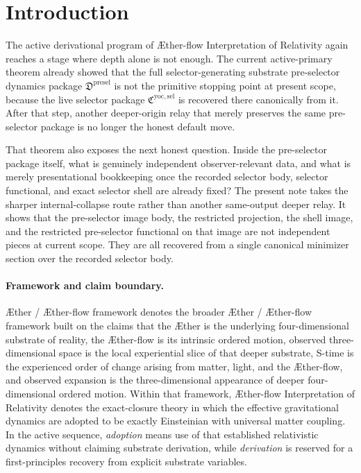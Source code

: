 \documentclass[11pt]{article}
\newcommand{\Aether}{\AE{}ther}
\newcommand{\Aflow}{\AE{}ther-flow}
\newcommand{\TheoryName}{\Aflow{} Interpretation of Relativity}
\newcommand{\TheoryProgram}{\Aether{} / \Aflow{} framework}
\newcommand{\YoctoSelectorPackage}{\mathfrak C^{\mathrm{yoc,sel}}}
\newcommand{\PreSelectorPackage}{\mathfrak D^{\mathrm{presel}}}
\begin{document}
\section{Introduction}

The active derivational program of \TheoryName{} again reaches a stage where depth alone is not enough. The current active-primary theorem already showed that the full selector-generating substrate pre-selector dynamics package \(\PreSelectorPackage\) is not the primitive stopping point at present scope, because the live selector package \(\YoctoSelectorPackage\) is recovered there canonically from it. After that step, another deeper-origin relay that merely preserves the same pre-selector package is no longer the honest default move.

That theorem also exposes the next honest question. Inside the pre-selector package itself, what is genuinely independent observer-relevant data, and what is merely presentational bookkeeping once the recorded selector body, selector functional, and exact selector shell are already fixed? The present note takes the sharper internal-collapse route rather than another same-output deeper relay. It shows that the pre-selector image body, the restricted projection, the shell image, and the restricted pre-selector functional on that image are not independent pieces at current scope. They are all recovered from a single canonical minimizer section over the recorded selector body.

\paragraph{Framework and claim boundary.}
\TheoryProgram{} denotes the broader \Aether{} / \Aflow{} framework built on the claims that the \Aether{} is the underlying four-dimensional substrate of reality, the \Aflow{} is its intrinsic ordered motion, observed three-dimensional space is the local experiential slice of that deeper substrate, S-time is the experienced order of change arising from matter, light, and the \Aflow{}, and observed expansion is the three-dimensional appearance of deeper four-dimensional ordered motion. Within that framework, \TheoryName{} denotes the exact-closure theory in which the effective gravitational dynamics are adopted to be exactly Einsteinian with universal matter coupling. In the active sequence, \emph{adoption} means use of that established relativistic dynamics without claiming substrate derivation, while \emph{derivation} is reserved for a first-principles recovery from explicit substrate variables.
\end{document}
